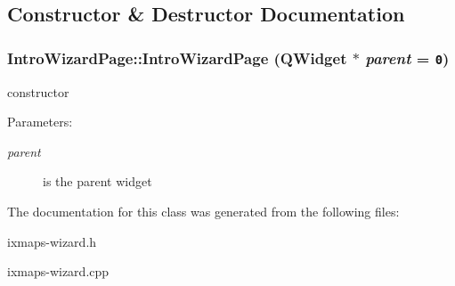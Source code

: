 \subsection{Constructor \& Destructor Documentation}
\hypertarget{classIntroWizardPage_0c8c54c63208431330f6f24e46e09435}{
\subsubsection[IntroWizardPage]{\setlength{\rightskip}{0pt plus 5cm}IntroWizardPage::IntroWizardPage (QWidget $\ast$ {\em parent} = {\tt 0})}}
\label{classIntroWizardPage_0c8c54c63208431330f6f24e46e09435}


constructor \begin{Desc}
\item[Parameters:]
\begin{description}
\item[{\em parent}]is the parent widget \end{description}
\end{Desc}


The documentation for this class was generated from the following files:\begin{CompactItemize}
\item 
ixmaps-wizard.h\item 
ixmaps-wizard.cpp\end{CompactItemize}
